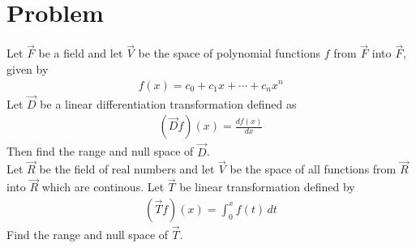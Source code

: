 \documentclass[journal,12pt,twocolumn]{IEEEtran}
\begin{document}
\section{Problem}
Let $\vec{F}$ be a field and let $\vec{V}$ be the space of polynomial functions $f$ from $\vec{F}$
into $\vec{F}$, given by
\begin{align*}
	f(x)=c_0+c_1x+\cdots +c_nx^n
\end{align*}
Let $\vec{D}$ be a linear differentiation transformation defined as
\begin{align*}
	(\vec{D}f)(x)=\frac{df(x)}{dx}
\end{align*}
Then find the range and null space of 
$\vec{D}$.\\
Let $\vec{R}$ be the field of real numbers and let $\vec{V}$ be the space of all functions from 
$\vec{R}$ into $\vec{R}$ which are continous. Let $\vec{T}$ be linear transformation defined by
\begin{align*}
	(\vec{T}f)(x)=\int_{0}^{x} f(t)\,dt
\end{align*}
Find the range and null space of $\vec{T}$.
\end{document}
